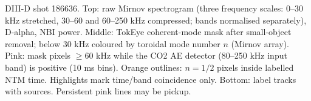 \caption{DIII-D shot 186636. Top: raw Mirnov spectrogram (three frequency scales: 0--30 kHz stretched, 30--60 and 60--250 kHz compressed; bands normalised separately), D-alpha, NBI power. Middle: TokEye coherent-mode mask after small-object removal; below 30 kHz coloured by toroidal mode number $n$ (Mirnov array). Pink: mask pixels $\geq$60 kHz while the CO2 AE detector (80--250 kHz input band) is positive (10 ms bins). Orange outlines: $n=1/2$ pixels inside labelled NTM time. Highlights mark time/band coincidence only. Bottom: label tracks with sources. Persistent pink lines may be pickup.}
\label{fig:interpreter-186636}
